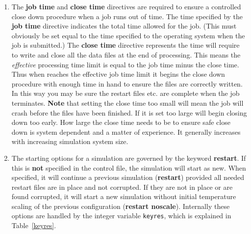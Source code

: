 \begin{enumerate}
\item The {\bf job time} and {\bf close time} directives are
required to ensure a controlled close down procedure when a job
runs out of time.  The time specified by the {\bf job time}
directive indicates the total time allowed for the job.  (This
must obviously be set equal to the time specified to the operating
system when the job is submitted.)  The {\bf close time} directive
represents the time \D will require to write and close all the
data files at the end of processing.  This means the {\em
effective} processing time limit is equal to the job time minus
the close time.  Thus when \D reaches the effective job time limit
it begins the close down procedure with enough time in hand to
ensure the files are correctly written.  In this way you may be
sure the restart files etc. are complete when the job terminates.
{\bf Note} that setting the close time too small will mean the job
will crash before the files have been finished.  If it is set too
large \D will begin closing down too early.  How large the close
time needs to be to ensure safe close down is system dependent and
a matter of experience.  It generally increases with increasing
simulation system size.

\item The starting options for a simulation are governed by the
keyword {\bf restart}.  If this is {\bf not} specified in the
control file, the simulation will start as new.  When specified, it
will continue a previous simulation ({\bf restart}) provided all
needed restart files are in place and not corrupted.  If they are
not in place or are found corrupted, it will start a new simulation
without initial temperature scaling of the previous configuration
({\bf restart noscale}).  Internally these options are handled by
the integer variable {\tt keyres}, which is explained in Table~\ref{keyres}.

\begin{table}[htbp]
\end{table}


\end{enumerate}

